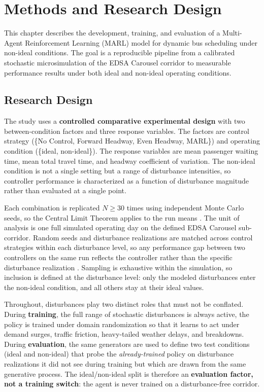 \chapter{Methods and Research Design}

This chapter describes the development, training, and evaluation of a Multi-Agent Reinforcement Learning (MARL) model for dynamic bus scheduling under non-ideal conditions. The goal is a reproducible pipeline from a calibrated stochastic microsimulation of the EDSA Carousel corridor to measurable performance results under both ideal and non-ideal operating conditions.


\section{Research Design}

The study uses a \textbf{controlled comparative experimental design} with two between-condition factors and three response variables. The factors are control strategy (\{No Control, Forward Headway, Even Headway, MARL\}) and operating condition (\{ideal, non-ideal\}). The response variables are mean passenger waiting time, mean total travel time, and headway coefficient of variation. The non-ideal condition is not a single setting but a range of disturbance intensities, so controller performance is characterized as a function of disturbance magnitude rather than evaluated at a single point.

Each combination is replicated $N \geq 30$ times using independent Monte Carlo seeds, so the Central Limit Theorem applies to the run means \cite{Wasserman2004}. The unit of analysis is one full simulated operating day on the defined EDSA Carousel sub-corridor. Random seeds and disturbance realizations are matched across control strategies within each disturbance level, so any performance gap between two controllers on the same run reflects the controller rather than the specific disturbance realization \cite{Henderson2018Matters,Agarwal2021Precipice}. Sampling is exhaustive within the simulation, so inclusion is defined at the disturbance level: only the modeled disturbances enter the non-ideal condition, and all others stay at their ideal values.

Throughout, disturbances play two distinct roles that must not be conflated. During \textbf{training}, the full range of stochastic disturbances is always active, the policy is trained under domain randomization \cite{Tang2024Curriculum} so that it learns to act under demand surges, traffic friction, heavy-tailed weather delays, and breakdowns. During \textbf{evaluation}, the same generators are used to define two test conditions (ideal and non-ideal) that probe the \textit{already-trained} policy on disturbance realizations it did not see during training but which are drawn from the same generative process. The ideal/non-ideal split is therefore an \textbf{evaluation factor, not a training switch}: the agent is never trained on a disturbance-free corridor. 
\pagebreak
